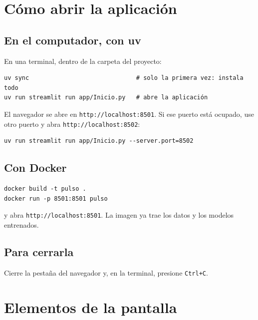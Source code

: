 \section{Cómo abrir la aplicación}

\subsection{En el computador, con uv}
En una terminal, dentro de la carpeta del proyecto:
\begin{verbatim}
uv sync                              # solo la primera vez: instala todo
uv run streamlit run app/Inicio.py   # abre la aplicación
\end{verbatim}
El navegador se abre en \texttt{http://localhost:8501}. Si ese puerto está ocupado,
use otro puerto y abra \texttt{http://localhost:8502}:
\begin{verbatim}
uv run streamlit run app/Inicio.py --server.port=8502
\end{verbatim}

\subsection{Con Docker}
\begin{verbatim}
docker build -t pulso .
docker run -p 8501:8501 pulso
\end{verbatim}
y abra \texttt{http://localhost:8501}. La imagen ya trae los datos y los modelos
entrenados.

\subsection{Para cerrarla}
Cierre la pestaña del navegador y, en la terminal, presione \texttt{Ctrl+C}.

\section{Elementos de la pantalla}

